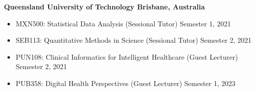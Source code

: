 \textbf{Queensland University of Technology \hfill Brisbane, Australia}\par
\begin{itemize}
	\item MXN500: Statistical Data Analysis (Sessional Tutor) \hfill Semester 1, 2021
	\item SEB113: Quantitative Methods in Science (Sessional Tutor) \hfill Semester 2, 2021
    \item PUN108: Clinical Informatics for Intelligent Healthcare (Guest Lecturer) \hfill Semester 2, 2021
	\item PUB358: Digital Health Perspectives (Guest Lecturer) \hfill Semester 1, 2023\par
\end{itemize}\par